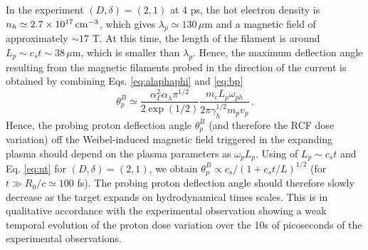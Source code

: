 \documentclass[aps,showpacs,superscriptaddress]{revtex4}
\begin{document}
In the experiment $(D,\delta)=(2,1)$ at 4 ps, the hot electron density is $n_h\simeq2.7 \times 10^{17}\,\rm cm^{-3}$, which gives $\lambda_p\simeq 130\, \mu$m and a magnetic field of approximately $\sim 17$ T. 
At this time, the length of the filament is around  $L_p \sim c_st \sim 38\, \mu$m, which is smaller than  $\lambda_p$.
Hence, the maximum deflection angle resulting from  the magnetic filaments probed in the direction of the current is obtained by combining Eqs. \eqref{eq:alaphaphi} and \eqref{eq:bp}
\begin{equation}
\theta^B_p \simeq  \frac{\alpha_\Gamma^2 \alpha_\lambda \pi^{1/2}}{2\exp(1/2)}      \frac{m_eL_p\omega_{ph}}{2\pi\gamma_h^{1/2}m_p v_p} \, . \label{eq:alaphap}
\end{equation}
Hence, the probing proton deflection angle $\theta_p^B$ (and therefore the RCF dose variation) off  the Weibel-induced magnetic field triggered in the expanding plasma should 
depend on the plasma parameters as $\omega_pL_p$. Using of $L_p \sim c_st $ and Eq. \eqref{eq:nt} for $(D,\delta)=(2,1)$, we obtain $\theta^B_p\propto c_s/(1+c_st/L)^{1/2}$ (for $t\gg R_0/c\simeq 100$ fs). The probing proton deflection angle should therefore slowly decrease as the   target expands on hydrodynamical times scales.
This is in qualitative accordance with the experimental observation showing a weak temporal evolution of the proton dose variation over the 10s of picoseconds of the experimental observations.
\end{document}

